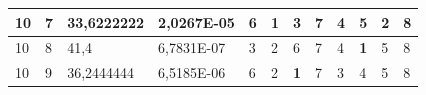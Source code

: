 \documentclass[conference]{IEEEtran}
\begin{document}
\begin{table}[]
\begin{tabular}{|llll|llllllll|}
\multicolumn{1}{|l|}{10}                                                    & \multicolumn{1}{l|}{7}                                                        & \multicolumn{1}{l|}{33,6222222}                                                   & 2,0267E-05                     & \multicolumn{1}{l|}{6}                                                  & \multicolumn{1}{l|}{\textbf{1}}                                         & \multicolumn{1}{l|}{3}                                                  & \multicolumn{1}{l|}{7}                                                  & \multicolumn{1}{l|}{4}                                                  & \multicolumn{1}{l|}{5}                                                  & \multicolumn{1}{l|}{2}                                                  & 8                          \\ \hline
\multicolumn{1}{|l|}{10}                                                    & \multicolumn{1}{l|}{8}                                                        & \multicolumn{1}{l|}{41,4}                                                         & 6,7831E-07                     & \multicolumn{1}{l|}{3}                                                  & \multicolumn{1}{l|}{2}                                                  & \multicolumn{1}{l|}{6}                                                  & \multicolumn{1}{l|}{7}                                                  & \multicolumn{1}{l|}{4}                                                  & \multicolumn{1}{l|}{\textbf{1}}                                         & \multicolumn{1}{l|}{5}                                                  & 8                          \\ \hline
\multicolumn{1}{|l|}{10}                                                    & \multicolumn{1}{l|}{9}                                                        & \multicolumn{1}{l|}{36,2444444}                                                   & 6,5185E-06                     & \multicolumn{1}{l|}{6}                                                  & \multicolumn{1}{l|}{2}                                                  & \multicolumn{1}{l|}{\textbf{1}}                                         & \multicolumn{1}{l|}{7}                                                  & \multicolumn{1}{l|}{3}                                                  & \multicolumn{1}{l|}{4}                                                  & \multicolumn{1}{l|}{5}                                                  & 8                          \\ \hline

\end{tabular}
\end{table}
\end{document}

